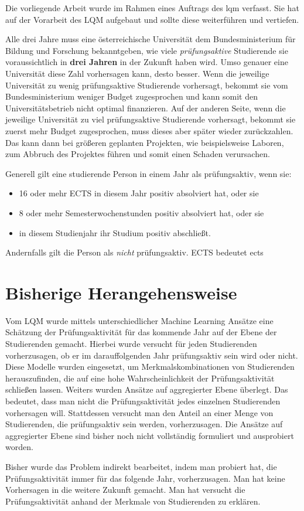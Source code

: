 

Die vorliegende Arbeit wurde im Rahmen eines Auftrags des \gls{lqm} verfasst. Sie hat auf der Vorarbeit des LQM aufgebaut und sollte diese weiterf\"uhren
und vertiefen.

Alle drei Jahre muss eine \"osterreichische Universität dem Bundesministerium f\"ur Bildung und Forschung
bekanntgeben, wie viele \textit{pr\"ufungsaktive} Studierende sie voraussichtlich in \textbf{drei Jahren}
in der Zukunft haben wird. Umso genauer eine Universität diese Zahl vorhersagen kann, desto besser.
Wenn die jeweilige Universität zu wenig pr\"ufungsaktive Studierende vorhersagt, bekommt sie vom Bundesministerium
weniger Budget zugesprochen und kann somit den Universitätsbetrieb nicht optimal finanzieren. Auf der anderen Seite,
wenn die jeweilige Universität zu viel pr\"ufungsaktive Studierende vorhersagt, bekommt sie zuerst mehr Budget zugesprochen,
muss dieses aber sp\"ater wieder zur\"uckzahlen. Das kann dann bei gr\"o{\ss}eren geplanten Projekten, wie beispielsweise Laboren,
zum Abbruch des Projektes f\"uhren und somit einen Schaden verursachen.

Generell gilt eine studierende Person in einem Jahr als pr\"ufungsaktiv, wenn sie:

\begin{itemize}
    \item 16 oder mehr ECTS in diesem Jahr positiv absolviert hat, oder sie
    \item 8 oder mehr Semesterwochenstunden positiv absolviert hat, oder sie
    \item in diesem Studienjahr ihr Studium positiv abschlie{\ss}t.
\end{itemize}
Andernfalls gilt die Person als \textit{nicht} pr\"ufungsaktiv.
ECTS bedeutet \gls{ects}


\section{Bisherige Herangehensweise}

Vom LQM wurde mittels unterschiedlicher Machine Learning Ans\"atze eine Sch\"atzung der Pr\"ufungsaktivit\"at
f\"ur das kommende Jahr auf der Ebene der Studierenden gemacht. 
Hierbei wurde versucht f\"ur jeden Studierenden vorherzusagen, ob er im darauffolgenden Jahr pr\"ufungsaktiv sein wird oder nicht.
Diese Modelle wurden eingesetzt, um Merkmalskombinationen von Studierenden herauszufinden,
die auf eine hohe Wahrscheinlichkeit der Pr\"ufungsaktivit\"at schlie{\ss}en lassen.
Weiters wurden Ans\"atze auf aggregierter Ebene \"uberlegt. Das bedeutet, dass man nicht die Pr\"ufungsaktivit\"at jedes
einzelnen Studierenden vorhersagen will. Stattdessen
versucht man den Anteil an einer Menge von Studierenden, die pr\"ufungsaktiv sein werden, vorherzusagen.
Die Ans\"atze auf aggregierter Ebene sind bisher noch nicht vollst\"andig formuliert und ausprobiert worden.


Bisher wurde das Problem indirekt bearbeitet, indem man probiert hat, die Pr\"ufungsaktivit\"at
immer f\"ur das folgende Jahr, vorherzusagen. Man hat keine Vorhersagen in die weitere Zukunft gemacht.
Man hat versucht die Pr\"ufungsaktivit\"at anhand der Merkmale von Studierenden zu erkl\"aren.

